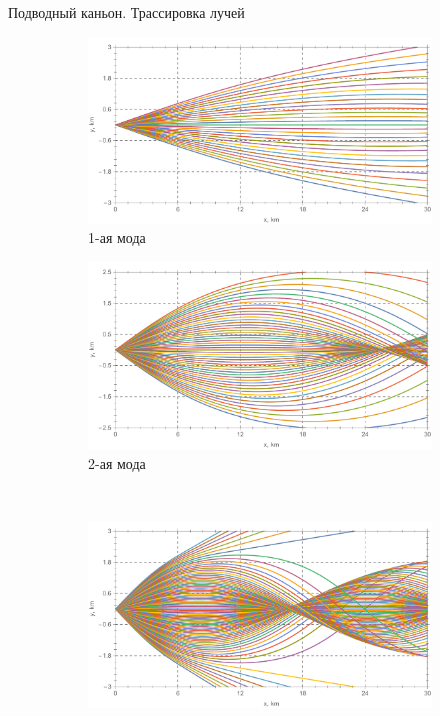 \documentclass{fefu_presentation}
\begin{document}
 	\begin{frame}{Подводный каньон. Трассировка лучей}
 		\begin{figure}[h]
 			\centering
             \begin{subfigure}{0.45\textwidth}
                 \centering
                 \includegraphics[width=\textwidth]{canyon_rays_1.pdf}
                 \caption{1-ая мода}
             \end{subfigure}
             \begin{subfigure}{0.45\textwidth}
                 \centering
                 \includegraphics[width=\textwidth]{canyon_rays_2.pdf}
                 \caption{2-ая мода}
             \end{subfigure}\\
             \begin{subfigure}{0.45\textwidth}
                 \centering
                 \includegraphics[width=\textwidth]{canyon_rays_3.pdf}

\end{subfigure}
\end{figure}
\end{frame}
\end{document}

